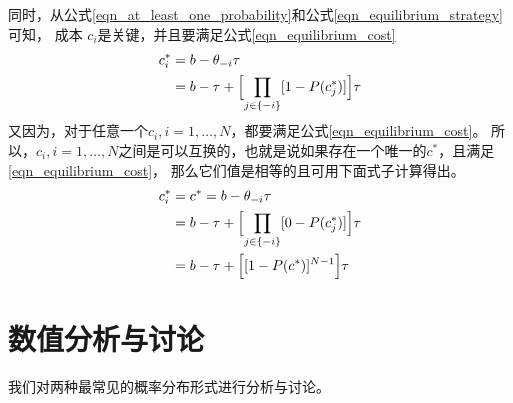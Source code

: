 同时，从公式\ref{eqn_at_least_one_probability}和公式\ref{eqn_equilibrium_strategy}可知，
成本 $c_i$是关键，并且要满足公式\ref{eqn_equilibrium_cost}
\begin{align}
    c_i^* &= b - \theta_{-i} \tau \notag\\
    &= b - \tau + \Bigl[ \prod_{j \in\{-i\} } [1 - P(c_j^*) ] \Bigr] \tau
    \label{eqn_equilibrium_cost} 
\end{align}
又因为，对于任意一个$c_i, i=1,\ldots, N$，都要满足公式\ref{eqn_equilibrium_cost}。
所以，$c_i, i=1,\ldots, N$之间是可以互换的，也就是说如果存在一个唯一的$c^*$，且满足\ref{eqn_equilibrium_cost}，
那么它们值是相等的且可用下面式子计算得出。
\begin{align}  
    c_i^* &= c^* = b - \theta_{-i} \tau \notag\\ 
    &= b - \tau  + \Bigl[ \prod_{j \in\{-i\} } [0 - P(c_j^*) ] \Bigr] \tau \notag\\ 
    &= b - \tau + \Bigl[ [1 - P(c^*)]^{N-1} \Bigr] \tau
\label{eqn:chap_bayesian:equilibrium_cost_equation}
\end{align}
\section{数值分析与讨论}
我们对两种最常见的概率分布形式进行分析与讨论。
